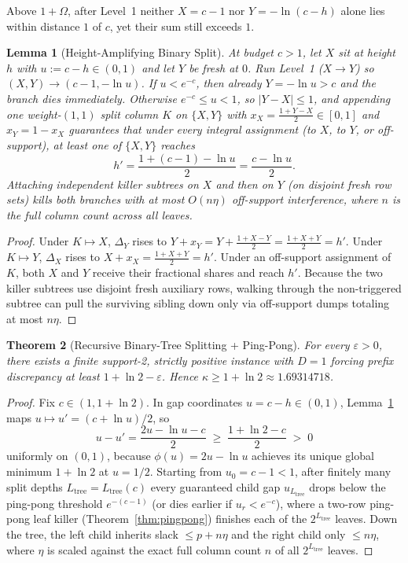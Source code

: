\documentclass[11pt]{article}
\newtheorem{theorem}{Theorem}
\newtheorem{lemma}[theorem]{Lemma}
\theoremstyle{definition}
\newcommand{\disc}{\Delta}
\newcommand{\eps}{\varepsilon}
\begin{document}
Above $1+\Omega$, after Level~1 neither $X=c-1$ nor $Y=-\ln(c-h)$ alone lies within distance $1$ of $c$, yet their sum still exceeds $1$.

\begin{lemma}[Height-Amplifying Binary Split]\label{lem:split}
At budget $c>1$, let $X$ sit at height $h$ with $u:=c-h\in(0,1)$ and let $Y$ be fresh at $0$. Run Level~1 ($X\to Y$) so $(X,Y)\to(c-1,-\ln u)$. If $u<e^{-c}$, then already $Y=-\ln u>c$ and the branch dies immediately. Otherwise $e^{-c}\le u<1$, so $|Y-X|\le 1$, and appending one weight-$(1,1)$ split column $K$ on $\{X,Y\}$ with $x_X=\frac{1+Y-X}{2}\in[0,1]$ and $x_Y=1-x_X$ guarantees that under every integral assignment (to $X$, to $Y$, or off-support), at least one of $\{X,Y\}$ reaches
\[
 h' = \frac{1+(c-1)-\ln u}{2} = \frac{c-\ln u}{2}.
\]
Attaching independent killer subtrees on $X$ and then on $Y$ (on disjoint fresh row sets) kills both branches with at most $O(n\eta)$ off-support interference, where $n$ is the full column count across all leaves.
\end{lemma}
\begin{proof}
Under $K\mapsto X$, $\disc_Y$ rises to $Y+x_Y=Y+\frac{1+X-Y}{2}=\frac{1+X+Y}{2}=h'$. Under $K\mapsto Y$, $\disc_X$ rises to $X+x_X=\frac{1+X+Y}{2}=h'$. Under an off-support assignment of $K$, both $X$ and $Y$ receive their fractional shares and reach $h'$. Because the two killer subtrees use disjoint fresh auxiliary rows, walking through the non-triggered subtree can pull the surviving sibling down only via off-support dumps totaling at most $n\eta$.
\end{proof}

\begin{theorem}[Recursive Binary-Tree Splitting + Ping-Pong]\label{thm:ln2}
For every $\eps>0$, there exists a finite support-2, strictly positive instance with $D=1$ forcing prefix discrepancy at least $1+\ln 2-\eps$. Hence $\kappa\ge 1+\ln 2\approx 1.69314718$.
\end{theorem}
\begin{proof}
Fix $c\in(1,1+\ln 2)$. In gap coordinates $u=c-h\in(0,1)$, Lemma~\ref{lem:split} maps $u\mapsto u'=(c+\ln u)/2$, so
\[
 u-u' = \frac{2u-\ln u-c}{2} \;\ge\; \frac{1+\ln 2-c}{2} \;>\; 0
\]
uniformly on $(0,1)$, because $\phi(u)=2u-\ln u$ achieves its unique global minimum $1+\ln 2$ at $u=1/2$. Starting from $u_0=c-1<1$, after finitely many split depths $L_{\mathrm{tree}}=L_{\mathrm{tree}}(c)$ every guaranteed child gap $u_{L_{\mathrm{tree}}}$ drops below the ping-pong threshold $e^{-(c-1)}$ (or dies earlier if $u_r<e^{-c}$), where a two-row ping-pong leaf killer (Theorem~\ref{thm:pingpong}) finishes each of the $2^{L_{\mathrm{tree}}}$ leaves. Down the tree, the left child inherits slack $\le p+n\eta$ and the right child only $\le n\eta$, where $\eta$ is scaled against the exact full column count $n$ of all $2^{L_{\mathrm{tree}}}$ leaves.
\end{proof}
\end{document}
